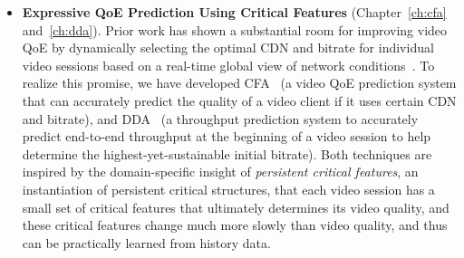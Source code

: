 \begin{itemize}

\item {\bf Expressive QoE Prediction Using Critical Features} 
(Chapter~\ref{ch:cfa} and~\ref{ch:dda}). 
Prior work has shown a substantial room for improving video QoE by 
dynamically selecting the optimal CDN and bitrate for individual video 
sessions based on a real-time global view of network 
conditions~\cite{sigcomm12}.
To realize this promise, we have developed CFA~\cite{cfa} (a video QoE prediction 
system that can accurately predict the quality of a video client if it uses 
certain CDN and bitrate), and DDA~\cite{dda} (a throughput prediction system
to accurately predict end-to-end throughput at the beginning of a 
 video session to help determine the highest-yet-sustainable initial bitrate).
Both techniques are inspired by the domain-specific insight of 
{\em persistent critical features}, an instantiation of persistent critical structures, that
each video session has a small set of critical features that ultimately 
determines its video quality, and these critical features change much 
more slowly than video quality, and thus can be practically 
learned from history data.


\end{itemize}
